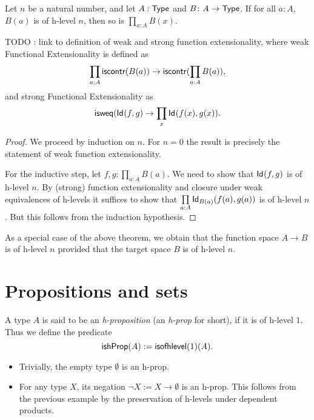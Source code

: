 \begin{thm}
 Let $n$ be a natural number, and let $A : \type$ and $B \colon A \to \type$.
     If for all $a : A$, $B(a)$ is of h-level $n$, then so is $\prod\limits_{x : A} B(x)$.
\end{thm}

TODO : link to definition of weak and strong function extensionality, where
weak Functional Extensionality is defined as
\[ \prod_{a : A} \iscontr (B(a)) \to \iscontr (\prod_{a : A} B(a)), \]
and strong Functional Extensionality as
\[ \isweq (\idtype{f}{g} \to \prod_x \idtype{f(x)}{g(x)}. \]

\begin{proof}
 We proceed by induction on $n$. For $n = 0$ the result is precisely the statement of weak function extensionality.
 
 For the inductive step, let $f, g : \prod\limits_{a:A}B(a)$. We need to show that
      $\idtype{f}{g}$ is of h-level $n$. By (strong) function extensionality and closure
      under weak equivalences of h-levels it suffices to show that
      $\prod\limits_{a : A} \idtype[B(a)]{f(a)}{g(a)}$ is of h-level $n$. But this follows from the
      induction hypothesis.
\end{proof}

\noindent
As a special case of the above theorem, we obtain that the function space $A \to B$ is of h-level $n$
provided that the target space $B$ is of h-level $n$.

\section{Propositions and sets}

\begin{defn}
 A type $A$ is said to be an \emph{h-proposition} (an \emph{h-prop} for short), if it is of h-level $1$.
  Thus we define the predicate
 \[\ishProp (A) := \isofhlevel(1)(A)  .\]
\end{defn}

\begin{egs}
 \begin{itemize}
  \item Trivially, the empty type $\emptyset$ is an h-prop.
  \item For any type $X$, its negation $\neg X := X \to \emptyset$ is an h-prop. This follows from the previous example by the preservation of h-levels under dependent products.
 \end{itemize}
\end{egs}

